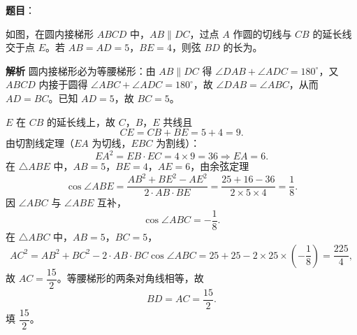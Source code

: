 \begin{answer}

\textbf{题目}：

如图，在圆内接梯形 $ABCD$ 中，$AB\parallel DC$，过点 $A$ 作圆的切线与 $CB$ 的延长线交于点 $E$。若 $AB=AD=5$，$BE=4$，则弦 $BD$ 的长为\gkblank{}。
\nopagebreak[4]
\begin{center}\end{center}
\nopagebreak[4]
\textbf{解析}
圆内接梯形必为等腰梯形：由 $AB\parallel DC$ 得 $\angle DAB+\angle ADC=180^\circ$，又 $ABCD$ 内接于圆得 $\angle ABC+\angle ADC=180^\circ$，故 $\angle DAB=\angle ABC$，从而 $AD=BC$。已知 $AD=5$，故 $BC=5$。

$E$ 在 $CB$ 的延长线上，故 $C$，$B$，$E$ 共线且
\nopagebreak[4]
\[CE=CB+BE=5+4=9.\]
由切割线定理（$EA$ 为切线，$EBC$ 为割线）：
\nopagebreak[4]
\[EA^2=EB\cdot EC=4\times9=36\Longrightarrow EA=6.\]
在 $\triangle ABE$ 中，$AB=5$，$BE=4$，$AE=6$，由余弦定理
\nopagebreak[4]
\[\cos\angle ABE=\frac{AB^2+BE^2-AE^2}{2\cdot AB\cdot BE}=\frac{25+16-36}{2\times5\times4}=\frac18.\]
因 $\angle ABC$ 与 $\angle ABE$ 互补，
\nopagebreak[4]
\[\cos\angle ABC=-\frac18.\]
在 $\triangle ABC$ 中，$AB=5$，$BC=5$，
\nopagebreak[4]
\[AC^2=AB^2+BC^2-2\cdot AB\cdot BC\cos\angle ABC=25+25-2\times25\times\left(-\frac18\right)=\frac{225}4,\]
故 $AC=\dfrac{15}2$。等腰梯形的两条对角线相等，故
\nopagebreak[4]
\[BD=AC=\frac{15}2.\]
填 $\dfrac{15}2$。


\end{answer}
